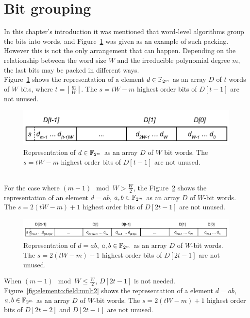 \section{Bit grouping}\label{bit-grouping}

In this chapter's introduction it was mentioned that word-level algorithms group the bits into words, and Figure~\ref{fig:elemento:field} was given as an example of such packing. However this is not the only arrangement that can happen. Depending on the relationship between the word size $W$ and the irreducible polynomial degree $m$, the last bits may be packed in different ways. \\

Figure~\ref{fig:elemento:field} shows the representation of a element $d \in {\mathbb F}_{2^m}$ as an array $D$ of $t$ words of $W$ bits, where $t = \left \lceil \frac{m}{W} \right \rceil$. The $s = tW-m$ highest order bits of $D[t-1]$ are not unused.
\begin{figure}[htb]
  \centering
  \includegraphics[width = .55\columnwidth]{figures/element-word.pdf}
\caption{Representation of $d \in {\mathbb F}_{2^m}$ as an array $D$ of $W$ bit words. The $s = tW-m$ highest order bits of $D[t-1]$ are not unused.}
\label{fig:elemento:field}
\end{figure}
\\

For the case where $(m-1) \mod{W} > \frac{W}{2}$, the Figure~\ref{fig:elemento:field:mult} shows the representation of an element $d = ab$, $a,b \in {\mathbb F}_{2^m}$ as an array $D$ of $W$-bit words. The $s = 2(tW-m)+1$ highest order bits of $D[2t-1]$ are not unused. \\

\begin{figure}
  \centering
  \includegraphics[width = .9\columnwidth]{figures/two-word-element-1.pdf}
\caption{Representation of $d = ab$, $a,b \in {\mathbb F}_{2^m}$ as an array $D$ of $W$-bit words. The $s = 2(tW-m)+1$ highest order bits of $D[2t-1]$ are not unused.}
\label{fig:elemento:field:mult}
\end{figure}


When $(m-1) \mod{W} \leq \frac{W}{2}$, $D[2t-1]$ is not needed.  Figure~\ref{fig:elemento:field:mult2} shows the representation of a element $d = ab$, $a,b \in {\mathbb F}_{2^m}$ as an array $D$ of $W$-bit words. The $s = 2(tW-m)+1$ highest order bits of $D[2t-2]$ and $D[2t-1]$ are not unused. \\

